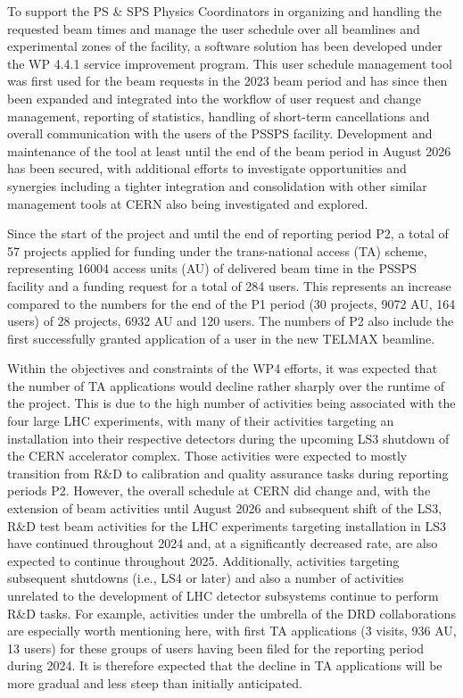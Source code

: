 To support the PS \& SPS Physics Coordinators in organizing and handling the requested beam times and manage the user schedule over all beamlines and experimental zones of the facility, a software solution has been developed under the WP 4.4.1 service improvement program. This user schedule management tool was first used for the beam requests in the 2023 beam period and has since then been expanded and integrated into the workflow of user request and change management, reporting of statistics, handling of short-term cancellations and overall communication with the users of the PSSPS facility. Development and maintenance of the tool at least until the end of the beam period in August 2026 has been secured, with additional efforts to investigate opportunities and synergies including a tighter integration and consolidation with other similar management tools at CERN also being investigated and explored. 

Since the start of the project and until the end of reporting period P2, a total of 57 projects applied for funding under the trans-national access (TA) scheme, representing 16004 access units (AU) of delivered beam time in the PSSPS facility and a funding request for a total of 284 users. This represents an increase compared to the numbers for the end of the P1 period (30 projects, 9072 AU, 164 users) of 28 projects, 6932 AU and 120 users. The numbers of P2 also include the first successfully granted application of a user in the new TELMAX beamline. 

Within the objectives and constraints of the WP4 efforts, it was expected that the number of TA applications would decline rather sharply over the runtime of the project. This is due to the high number of activities being associated with the four large LHC experiments, with many of their activities targeting an installation into their respective detectors during the upcoming LS3 shutdown of the CERN accelerator complex. Those activities were expected to mostly transition from R\&D to calibration and quality assurance tasks during reporting periods P2. However, the overall schedule at CERN did change and, with the extension of beam activities until August 2026 and subsequent shift of the LS3, R\&D test beam activities for the LHC experiments targeting installation in LS3 have continued throughout 2024 and, at a significantly decreased rate, are also expected to continue throughout 2025. Additionally, activities targeting subsequent shutdowns (i.e., LS4 or later) and also a number of activities unrelated to the development of LHC detector subsystems continue to perform R\&D tasks. For example, activities under the umbrella of the DRD collaborations are especially worth mentioning here, with first TA applications (3 visits, 936 AU,  13 users) for these groups of users having been filed for the reporting period during 2024. It is therefore expected that the decline in TA applications will be more gradual and less steep than initially anticipated. 

